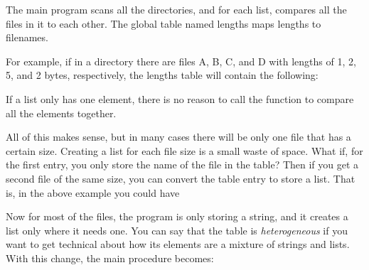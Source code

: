 The main program scans all the directories, and for each list, compares
all the files in it to each other. The global table named
\textsf{lengths} maps lengths to filenames.


For example, if in a directory there are files A, B, C, and D with
lengths of 1, 2, 5, and 2 bytes, respectively, the \textsf{lengths}
table will contain the following: 


If a list only has one element, there is no reason to call the function
to compare all the elements together. 

All of this makes sense, but in many cases there will be only one file
that has a certain size. Creating a list for each file size is a small
waste of space. What if, for the first entry, you only store the name
of the file in the table? Then if you get a second file of the same
size, you can convert the table entry to store a list. That is, in the
above example you could have 


Now for most of the files, the program is only storing a string, and it
creates a list only where it needs one. You can say that the table is
\textit{heterogeneous} if you want to get technical about how its
elements are a mixture of strings and lists. With this change, the main
procedure becomes:

